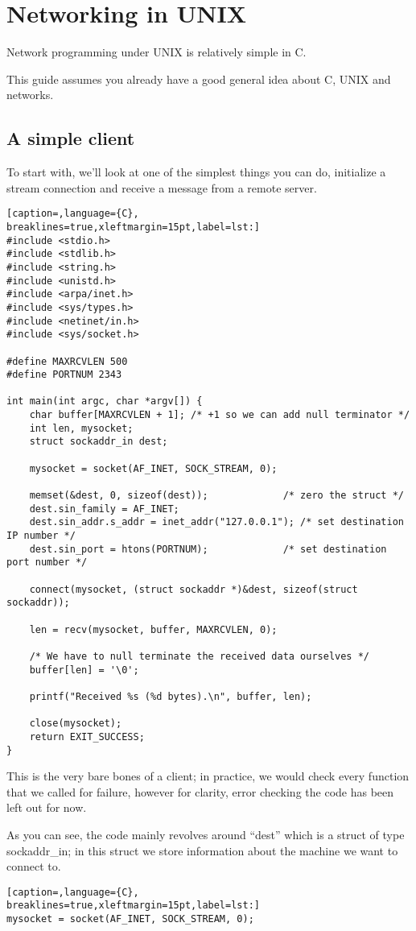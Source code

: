 \section{Networking in UNIX}
Network programming under UNIX is relatively simple in C.

This guide assumes you already have a good general idea about C, UNIX and
networks.

\subsection{A simple client}
To start with, we'll look at one of the simplest things you can do, initialize
a stream connection and receive a message from a remote server.
\lstset{basicstyle=\scriptsize, numbers=left, captionpos=b, tabsize=4}
\begin{lstlisting}[caption=,language={C},
breaklines=true,xleftmargin=15pt,label=lst:]
#include <stdio.h>
#include <stdlib.h>
#include <string.h>
#include <unistd.h>
#include <arpa/inet.h>
#include <sys/types.h>
#include <netinet/in.h>
#include <sys/socket.h>

#define MAXRCVLEN 500
#define PORTNUM 2343

int main(int argc, char *argv[]) {
	char buffer[MAXRCVLEN + 1]; /* +1 so we can add null terminator */
	int len, mysocket;
	struct sockaddr_in dest; 

	mysocket = socket(AF_INET, SOCK_STREAM, 0);
 
	memset(&dest, 0, sizeof(dest));				/* zero the struct */
	dest.sin_family = AF_INET;
	dest.sin_addr.s_addr = inet_addr("127.0.0.1"); /* set destination IP number */ 
	dest.sin_port = htons(PORTNUM);				/* set destination port number */

	connect(mysocket, (struct sockaddr *)&dest, sizeof(struct sockaddr));
 
	len = recv(mysocket, buffer, MAXRCVLEN, 0);

	/* We have to null terminate the received data ourselves */
	buffer[len] = '\0';

	printf("Received %s (%d bytes).\n", buffer, len);

	close(mysocket);
	return EXIT_SUCCESS;
}
\end{lstlisting}

This is the very bare bones of a client; in practice, we would check every
function that we called for failure, however for clarity, error checking the
code has been left out for now.

As you can see, the code mainly revolves around ``dest'' which is a struct of
type sockaddr\_in; in this struct we store information about the machine we
want to connect to.
\lstset{basicstyle=\scriptsize, numbers=left, captionpos=b, tabsize=4}
\begin{lstlisting}[caption=,language={C},
breaklines=true,xleftmargin=15pt,label=lst:]
mysocket = socket(AF_INET, SOCK_STREAM, 0);
\end{lstlisting}

